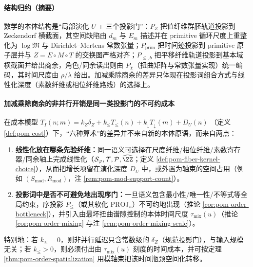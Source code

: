 \paragraph{结构归约（摘要）}
数学的本体结构是“局部演化 $U$ + 三个投影门”：$P_Z$ 把值纤维群胚轨道投影到 Zeckendorf 横截面，其空间缺陷由 $d_m$ 与 $E_m$ 描述并在 primitive 循环尺度上重整化为 $\log\mathfrak{M}$ 与 Dirichlet--Mertens 常数张量；$P_{\mathrm{prim}}$ 把时间迹投影到 primitive 原子层并与 $Z=E\circ M\circ T$ 的交换图严格对齐；$P_{\le,b}$ 把平移纤维轨道投影到基本域横截面并给出商余，角色/同余读出则由 $P_\chi$（扭曲矩阵与常数张量实现）统一编码，其时间尺度由 $\rho/\lambda$ 给出。加减乘除商余的差异只体现在投影词组合方式与线性化深度（素数纤维或相位纤维路线）的选择上。

\paragraph{加减乘除商余的非并行开销是同一类投影门的不可约成本}
在成本模型
\(
T_I(n;m)=k_Z\delta_Z+k_{\le}T_{\le}(n)+k_{\downarrow}T_{\downarrow}(m)+D_U(n)
\)
（定义 \ref{def:pom-cost}）下，“六种算术”的差异并不来自新的本体原语，而来自两点：
\begin{enumerate}
  \item \textbf{线性化放在哪条先验纤维：}同一语义可选择在尺度纤维/相位纤维/素数寄存器/同余轴上完成线性化（\(\mathcal{S}_\varphi,\mathcal{T},\mathcal{P},\widehat{\ZZ}\)；定义 \ref{def:pom-fiber-kernel-choice}），从而把增长项留在演化深度 \(D_U\) 中，或外置为轴束的空间占用（例如 \((S_{\mathrm{mod}},R_{\mathrm{mod}})\)，注 \ref{rem:pom-mod-support-count}）。
  \item \textbf{投影词中是否不可避免地出现序门：}一旦语义包含最小性/唯一性/不等式等全局约束，序投影 \(P_{\le}\)（或其软化 \(\mathrm{PROJ}_u\)）不可约地出现（推论 \ref{cor:pom-order-bottleneck}），并引入由最坏扭曲谱隙控制的本体时间尺度 \(\tau_{\mathrm{mix}}(u)\)（推论 \ref{cor:pom-order-mixing} 与注 \ref{rem:pom-order-mixing-scale}）。
\end{enumerate}
特别地：若 \(k_{\le}=0\)，则非并行延迟只含常数级的 \(\delta_Z\)（规范投影门），与输入规模无关；若 \(k_{\le}>0\)，则必须付出由 \(\tau_{\mathrm{mix}}(u)\) 刻度的时间成本，并可按定理 \ref{thm:pom-order-spatialization} 用模轴束把该时间瓶颈空间化转移。

